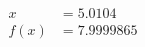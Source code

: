 \documentclass[preview]{standalone}
\begin{document}
\begin{align*}
x &= 5.0104\\f(x) &= 7.9999865
\end{align*}
\end{document}
